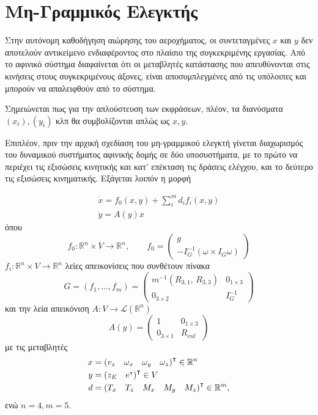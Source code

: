 \section{Μη-Γραμμικός Ελεγκτής}

Στην αυτόνομη καθοδήγηση αιώρησης του αεροχήματος, οι συντεταγμένες \(x\) και 
\(y\) δεν αποτελούν αντικείμενο ενδιαφέροντος στο πλαίσιο της συγκεκριμένης 
εργασίας. Από το αφινικό σύστημα διαφαίνεται ότι οι μεταβλητές κατάστασης που 
απευθύνονται στις κινήσεις στους συγκεκριμένους άξονες, είναι αποσυμπλεγμένες 
από τις υπόλοιπες και μπορούν να απαλειφθούν από το σύστημα.

Σημειώνεται πως για την απλούστευση των εκφράσεων, πλέον, τα διανύσματα $(x_i), 
(y_i)$ κλπ θα συμβολίζονται απλώς ως $x, y$. 

Επιπλέον, πριν την αρχική σχεδίαση του μη-γραμμικού ελεγκτή γίνεται διαχωρισμός 
του δυναμικού συστήματος αφινικής δομής σε δύο υποσυστήματα, με το πρώτο να 
περιέχει τις εξισώσεις κινητικής και κατ' επέκταση τις δράσεις ελέγχου, και το 
δεύτερο τις εξισώσεις κινηματικής. Εξάγεται λοιπόν η μορφή

\begin{gather}
    \dot{x} = f_{0}(x, y) + 
        \sum_{i}^{m}{d_{i}f_{i}}(x, y)
        \label{ctl:knt} \\
    \dot{y} = A(y)x
    \label{ctl:knm}   
\end{gather}
όπου  
\begin{equation}
    f_0:\mathbb{R}^{n} \times V \rightarrow \mathbb{R}^{n}
    ,\qquad
    f_{0} = \begin{pmatrix}
        g \\ 
        -I_{G}^{-1}(\omega \times I_{G}\omega)
    \end{pmatrix}
    \label{ctl:f0}
\end{equation}
$f_{i}:\mathbb{R}^{n} \times V \rightarrow \mathbb{R}^{n}$ λείες απεικονίσεις 
που συνθέτουν πίνακα
\begin{equation*}
    G =\left(f_1, \ldots, f_{m}\right) = 
    \begin{pmatrix}
        m^{-1}\left(R_{3,1}, \, R_{3,3}\right) & 0_{1\times 3}\\
        0_{3\times 2} & I_G^{-1}
    \end{pmatrix}
\end{equation*}
και την λεία απεικόνιση $A:V\rightarrow\mathcal{L}(\mathbb{R}^{n})$
\begin{equation*}
    A(y) = \begin{pmatrix}
        1 & 0_{1\times 3} \\
        0_{3\times 1} & R_{eul}
    \end{pmatrix}
\end{equation*}
με τις μεταβλητές
\begin{align*}
    x &= \left(v_{z} \quad \omega_{x} \quad \omega_{y} \quad \omega_{z}
    \right)^{\intercal} \in \mathbb{R}^n\\
    y &= \left(z_{E} \quad e^{\scriptscriptstyle \intercal}\right)^{\intercal} 
    \in V \\
    d &= \left(T_x \quad T_z \quad M_x \quad M_y \quad M_z\right)^{\intercal} 
    \in \mathbb{R}^{m} ,
\end{align*}
ενώ $n = 4, m = 5$. 

